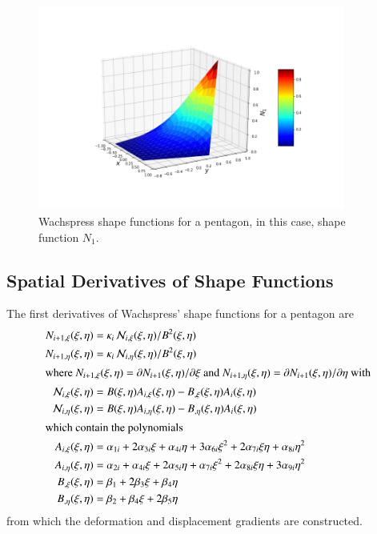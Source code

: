 \begin{figure}
	\centering
	\includegraphics[width=0.9\textwidth]{figures/shapeFunction.jpg}
	\caption{Wachspress shape functions for a pentagon, in this case, shape function $N_1$.}
	\label{figShapeFuntion}
\end{figure}

\subsection{Spatial Derivatives of Shape Functions}

The first derivatives of Wachspress' shape functions for a pentagon are
\begin{subequations}
	\begin{align}
	N_{i+1,\xi} (\xi, \eta) & = \kappa_i \, \mathcal{N}_{i,\xi}(\xi, \eta) /
	B^2(\xi, \eta) \\
	N_{i+1,\eta} (\xi, \eta) & = \kappa_i \, \mathcal{N}_{i,\eta}(\xi, \eta) /
	B^2(\xi, \eta) \\
	\intertext{where $N_{i+1,\xi}  (\xi, \eta) = \partial N_{i+1} (\xi, \eta) / \partial \xi$ and $N_{i+1,\eta} (\xi, \eta) = \partial N_{i+1} (\xi, \eta) / \partial \eta$ with}
	\mathcal{N}_{i,\xi} (\xi,\eta) & = B(\xi, \eta) A_{i,\xi} (\xi, \eta) -
	B_{,\xi} (\xi, \eta) A_i (\xi, \eta) \\
	\mathcal{N}_{i,\eta} (\xi,\eta) & = B(\xi, \eta) A_{i,\eta} (\xi, \eta) - 
	B_{,\eta} (\xi, \eta) A_i (\xi, \eta) \\
	\intertext{which contain the polynomials}
	A_{i,\xi} (\xi, \eta) & = \alpha_{1i} + 2 \alpha_{3i} \xi + \alpha_{4i} \eta +
	3 \alpha_{6i} \xi^2 + 2 \alpha_{7i} \xi \eta + \alpha_{8i} \eta^2
	\label{shapeFnGradXiNum} \\
	A_{i,\eta} (\xi, \eta) & = \alpha_{2i} + \alpha_{4i} \xi + 2 \alpha_{5i} \eta + 
	\alpha_{7i} \xi^2 + 2 \alpha_{8i} \xi\eta + 3 \alpha_{9i} \eta^2 
	\label{shapeFnGradEtaNum} \\
	B_{,\xi} (\xi, \eta) & = \beta_1 + 2 \beta_3 \xi + \beta_4 \eta
	\label{shapeFnGradXiDenom} \\
	B_{,\eta} (\xi, \eta) & = \beta_2 + \beta_4 \xi + 2 \beta_5 \eta 
	\label{shapeFnGradEtaDenom}
	\end{align}
\end{subequations}
from which the deformation and displacement gradients are constructed.

